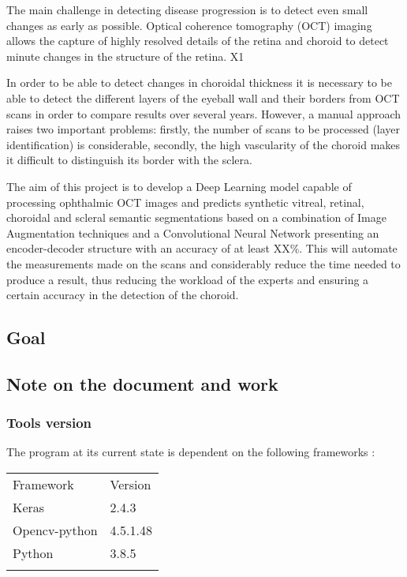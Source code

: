\documentclass[12pt,a4paper]{scrartcl}
\begin{document}
The main challenge in detecting disease progression is to detect even small changes as early as possible. Optical coherence tomography (OCT) imaging allows the capture of highly resolved details of the retina and choroid to detect minute changes in the structure of the retina. X1

In order to be able to detect changes in choroidal thickness it is necessary to be able to detect the different layers of the eyeball wall and their borders from OCT scans in order to compare results over several years. 
However, a manual approach raises two important problems: firstly, the number of scans to be processed (layer identification) is considerable, secondly, the high vascularity of the choroid makes it difficult to distinguish its border with the sclera.

The aim of this project is to develop a Deep Learning model capable of processing  ophthalmic  OCT  images  and predicts  synthetic  vitreal,  retinal,  choroidal  and  scleral  semantic  segmentations  based  on  a  combination  of  Image  Augmentation  techniques  and  a Convolutional Neural Network presenting an encoder-decoder structure with an accuracy of at least XX\%. This will automate the measurements made on the scans and considerably reduce the time needed to produce a result, thus reducing the workload of the experts and ensuring a certain accuracy in the detection of the choroid. 


\subsection{Goal}
\subsection{Note on the document and work}
\subsubsection{Tools version}
The program at its current state is dependent on the following frameworks : 
    
    \begin{table}[]
    \begin{tabular}{ll}
    Framework & Version \\
    Keras     & 2.4.3   \\
    Opencv-python  &   4.5.1.48 \\
    Python & 3.8.5 \\
              &        
    \end{tabular}
    \end{table}
\end{document}
